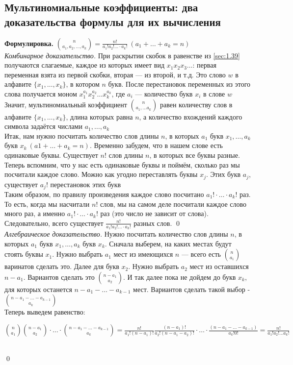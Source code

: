 \documentclass[a4paper]{article}
\begin{document}
\subsection{Мультиномиальные коэффициенты: два доказательства формулы для их вычисления}
\textbf{Формулировка.} $\binom{n}{a_1,a_2,\ldots,a_k}=\frac{n!}{a_1!a_2!\ldots\cdot a_k!}\ (a_1+\ldots+a_k=n)$\\[2mm]
\textit{Комбинарное доказательство.} При раскрытии скобок в равенстве из \ref{sec:1.39} получаются слагаемые, каждое из которых имеет вид $x_1x_2x_3\ldots$: первая переменная взята из первой скобки, вторая — из второй, и т.д. Это слово $w$ в алфавите $\{x_1,\ldots, x_k\}$, в котором $n$ букв. После перестановок переменных из этого слова получается моном $x_1^{a_1}x_2^{a_2}\ldots x_k^{a_k}$, где $a_i$ — количество букв $x_i$ в слове $w$\\[2mm]
 Значит, мультиномиальный коэффициент $\binom{n}{a_1,\ldots a_k}$ равен количеству слов в алфавите $\{x_1,\ldots, x_k\}$, длина которых равна $n$, а количество вхождений каждого символа задаётся числами $a_1,\ldots,a_k$\\[2mm]
 Итак, нам нужно посчитать количество слов длины $n$, в которых $a_1$ букв $x_1,\ldots,a_k$ букв $x_k\ (a1+\ldots+a_k=n)$. Временно забудем, что в нашем слове есть одинаковые буквы. Существует $n!$ слов длины $n$, в которых все буквы разные.\\[2mm]
 Теперь вспомним, что у нас есть одинаковые буквы и поймём, сколько раз мы посчитали каждое слово. Можно как угодно переставлять буквы $x_j$. Этих букв $a_j$, существует $a_j!$ перестановок этих букв\\[2mm]
 Таким образом, по правилу произведения каждое слово посчитано $a_1!\cdot\ldots\cdot a_k!$ раз. То есть, когда мы насчитали $n!$ слов, мы на самом деле посчитали каждое слово много раз, а именно $a_1!\cdot\ldots\cdot a_k!$ раз (это число не зависит от слова). Следовательно,
всего существует $\frac{n!}{a_1!a_2!\ldots\cdot a_k!}$ разных слов. \qed\\[2mm]
\textit{Алгебраическое доказательство.} Нужно посчитать количество слов
длины $n$, в которых $a_1$ букв $x_1,\ldots,a_k$ букв $x_k$. Сначала выберем, на каких местах будут стоять буквы $x_1$. Нужно выбрать $a_1$ мест из имеющихся $n$ — всего есть $\binom{n}{a_1}$ варинатов сделать это. Далее для букв $x_2$. Нужно выбрать $a_2$ мест из оставшихся $n-a_1$. Вариантов сделать это $\binom{n-a_1}{a_2}$. И так далее пока не дойдем до букв $x_k$, для которых останется $n-a_1-\ldots-a_{k-1}$ мест. Вариантов сделать такой выбор - $\binom{n-a_1-\ldots-a_{k-1}}{a_k}$\\[2mm]
Теперь выведем равенство:\\[2mm]
\centerline{$\binom{n}{a_1}\binom{n-a_1}{a_2}\cdot\ldots\cdot\binom{n-a_1-\ldots-a_{k-1}}{a_k}=\frac{n!}{a_1!(n-a_1)!}\frac{(n-a_1)!}{a_2!(n-a_1-a_2)!}\cdot\ldots\cdot\frac{(n-a_1-\ldots-a_{k-1})}{a_k!0!}=\frac{n!}{a_1!a_2!\ldots a_k!}$}\\[2mm]
\qed
\end{document}
